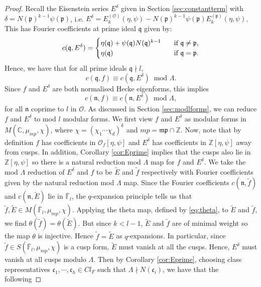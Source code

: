 \documentclass[a4paper,oneside]{amsart}
\theoremstyle{plain}
\theoremstyle{definition}
\begin{document}
\begin{proof}
    Recall the Eisenstein series $E^\delta$ given in Section \ref{sec:constantterm} with $\delta= N(\mathfrak{p})^{k-1}\psi(\mathfrak{p})$, i.e. $E^\delta = E_k^{(\mathcal{O})}(\eta, \psi) - N(\mathfrak{p})^{k-1}\psi(\mathfrak{p})E_k^{(\mathfrak{p})}(\eta, \psi)$. This has Fourier coefficients at prime ideal $\mathfrak{q}$ given by:
    \begin{equation*}
       c(\mathfrak{q}, E^\delta) =  \begin{cases}
            \eta(\mathfrak{q}) + \psi(\mathfrak{q})N(\mathfrak{q})^{k-1} \hspace{3mm} &\text{if } \mathfrak{q} \neq \mathfrak{p}, \\
            \eta(\mathfrak{q}) &\text{if } \mathfrak{q} = \mathfrak{p}.
        \end{cases}
    \end{equation*}
    Hence, we have that for all prime ideals $\mathfrak{q} \nmid l$,
    \begin{equation*}
        c(\mathfrak{q}, f) \equiv c(\mathfrak{q}, E^\delta) \ \text{ mod } \Lambda.
    \end{equation*}
    Since $f$ and $E^\delta$ are both normalised Hecke eigenforms, this implies
    \begin{equation*}
        c(\mathfrak{n}, f) \equiv c(\mathfrak{n}, E^\delta) \ \text{ mod } \Lambda,
    \end{equation*}
    for all $\mathfrak{n}$ coprime to $l$ in $\mathcal{O}$.
    As discussed in Section \ref{sec:modlforms}, we can reduce $f$ and $E^\delta$ to mod $l$ modular forms. We first view $f$ and $E^\delta$ as modular forms in $M(\mathbb{C}, \mu_{mp}, \chi)$, where $\chi = (\chi_1 \cdots \chi_d)^k$ and $mp=\mathfrak{mp} \cap \mathbb{Z}$. Now, note that by definition $f$ has coefficients in $\mathcal{O}_f[\eta, \psi]$ and $E^\delta$ has coefficients in $\mathbb{Z}[\eta,\psi]$ away from cusps. In addition, Corollary \ref{cor:Eprime} implies that the cusps also lie in $\mathbb{Z}[\eta, \psi]$ so there is a natural reduction mod $\Lambda$ map for $f$ and $E^\delta$. We take the mod $\Lambda$ reduction of $E^\delta$ and $f$ to be $\tilde{E}$ and $\tilde{f}$ respectively with Fourier coefficients given by the natural reduction mod $\Lambda$ map. Since the Fourier coefficients $c(\mathfrak{n},\tilde{f})$ and $c(\mathfrak{n}, \tilde{E})$ lie in $\bar{\mathbb{F}}_l$, the $q$-expansion principle tells us that 
     $\tilde{f}, \tilde{E} \in M(\bar{\mathbb{F}}_l, \mu_{mp}, \chi)$. Applying the theta map, defined by \eqref{eq:theta}, to $\tilde{E}$ and $\tilde{f}$, we find $\theta(\tilde{f})=\theta(\tilde{E})$. But since $k < l - 1$, $\tilde{E}$ and $\tilde{f}$ are of minimal weight so the map $\theta$ is injective. Hence $\tilde{f} = \tilde{E}$ as $q$-expansions. In particular, since $\tilde{f} \in S(\bar{\mathbb{F}}_l, \mu_{mp}, \chi)$ is a cusp form, $\tilde{E}$ must vanish at all the cusps. Hence, $E^\delta$ must vanish at all cusps modulo $\Lambda$. Then by Corollary \ref{cor:Eprime}, choosing class representatives $\mathfrak{c}_1, \cdots, \mathfrak{c}_h \in Cl_F$ such that $\Lambda \nmid N(\mathfrak{c}_i)$, we have that the following

\end{proof}
\end{document}
